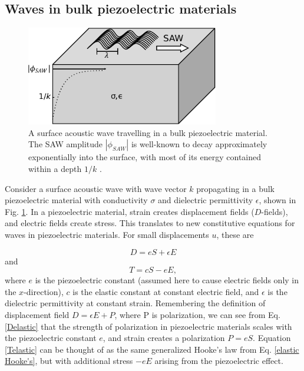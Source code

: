 \documentclass[double,12pt,1in]{beavtex}
\begin{document}
\subsection{Waves in bulk piezoelectric materials}
\begin{figure}
    \includegraphics[width=0.75\textwidth]{SAW in bulk semi.pdf}
    \caption{A surface acoustic wave travelling in a bulk piezoelectric material. The SAW amplitude $|\phi_{SAW}|$ is well-known to decay approximately exponentially into the surface, with most of its energy contained within a depth $1/k$ \cite{wixforth_surface_1989}.}
    \label{SAWbulksemi}
\end{figure}

Consider a surface acoustic wave with wave vector $k$ propagating in a bulk piezoelectric material with conductivity $\sigma$ and dielectric permittivity $\epsilon$, shown in Fig. \ref{SAWbulksemi}. In a piezoelectric material, strain creates displacement fields ($D$-fields), and electric fields create stress. This translates to new constitutive equations for waves in piezoelectric materials. For small displacements $u$, these are

\begin{equation} 
    D = eS + \epsilon E \label{Delastic}
\end{equation}
and
\begin{equation} 
    T = cS -eE, \label{Telastic}
\end{equation}
where $e$ is the piezoelectric constant (assumed here to cause electric fields only in the $x$-direction), $c$ is the elastic constant at constant electric field, and $\epsilon$ is the dielectric permittivity at constant strain. Remembering the definition of displacement field $D = \epsilon E + P$, where P is polarization, we can see from Eq. \ref{Delastic} that the strength of polarization in piezoelectric materials scales with the piezoelectric constant $e$, and strain creates a polarization $P = eS$. Equation \ref{Telastic} can be thought of as the same generalized Hooke's law from Eq. \ref{elastic Hooke's}, but with additional stress $-eE$ arising from the piezoelectric effect. 
\end{document}
